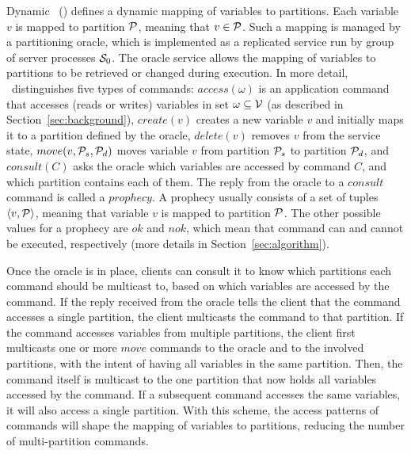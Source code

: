 Dynamic \ssmr\ (\dssmr) defines a dynamic mapping of variables to partitions.
Each variable $v$ is mapped to partition $\mathcal{P}$, meaning that $v \in \mathcal{P}$.
Such a mapping is managed by a partitioning oracle, which is implemented as a replicated service run by group of server processes $\mathcal{S}_0$.
The oracle service allows the mapping of variables to partitions to be retrieved or changed during execution.
In more detail, \dssmr\ distinguishes five types of commands:
$access(\omega)$ is an application command that accesses (reads or writes) variables in set $\omega \subseteq \mathcal{V}$ (as described in Section~\ref{sec:background}),
$create(v)$ creates a new variable $v$ and initially maps it to a partition defined by the oracle,
$delete(v)$ removes $v$ from the service state,
$move(v,\mathcal{P}_s,\mathcal{P}_d)$ moves variable $v$ from partition $\mathcal{P}_s$ to partition $\mathcal{P}_d$,
and $consult(C)$ asks the oracle which variables are accessed by command $C$, and which partition contains each of them.
The reply from the oracle to a $consult$ command is called a $prophecy$.
A prophecy usually consists of a set of tuples $\langle v, \mathcal{P} \rangle$, meaning that variable $v$ is mapped to partition $\mathcal{P}$.
The other possible values for a prophecy are $ok$ and $nok$, which mean that command can and cannot be executed, respectively (more details in Section~\ref{sec:algorithm}).


Once the oracle is in place, clients can consult it to know which partitions each command should be multicast to, based on which variables are accessed by the command.
If the reply received from the oracle tells the client that the command accesses a single partition, the client multicasts the command to that partition.
If the command accesses variables from multiple partitions, the client first multicasts one or more $move$ commands to the oracle and to the involved partitions, with the intent of having all variables in the same partition.
Then, the command itself is multicast to the one partition that now holds all variables accessed by the command.
If a subsequent command accesses the same variables, it will also access a single partition.
With this scheme, the access patterns of commands will shape the mapping of variables to partitions, reducing the number of multi-partition commands.

